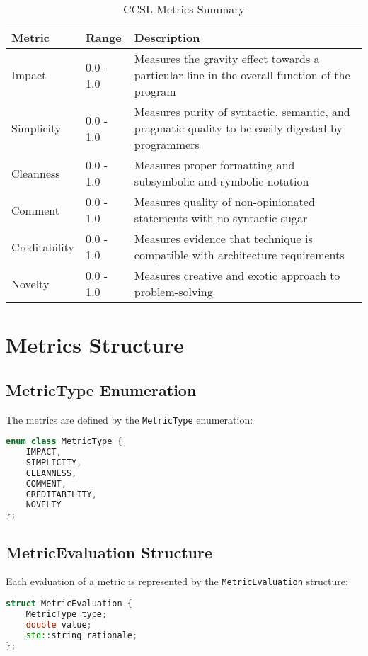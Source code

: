 \documentclass[11pt,a4paper]{report}
\begin{document}
\begin{table}[H]
\centering
\begin{tabular}{llp{8cm}}
\toprule
\textbf{Metric} & \textbf{Range} & \textbf{Description} \\
\midrule
Impact & 0.0 - 1.0 & Measures the gravity effect towards a particular line in the overall function of the program \\
Simplicity & 0.0 - 1.0 & Measures purity of syntactic, semantic, and pragmatic quality to be easily digested by programmers \\
Cleanness & 0.0 - 1.0 & Measures proper formatting and subsymbolic and symbolic notation \\
Comment & 0.0 - 1.0 & Measures quality of non-opinionated statements with no syntactic sugar \\
Creditability & 0.0 - 1.0 & Measures evidence that technique is compatible with architecture requirements \\
Novelty & 0.0 - 1.0 & Measures creative and exotic approach to problem-solving \\
\bottomrule
\end{tabular}
\caption{CCSL Metrics Summary}
\end{table}

\section{Metrics Structure}

\subsection{MetricType Enumeration}
The metrics are defined by the \texttt{MetricType} enumeration:

\begin{lstlisting}[language=C++]
enum class MetricType {
    IMPACT,
    SIMPLICITY,
    CLEANNESS,
    COMMENT,
    CREDITABILITY,
    NOVELTY
};
\end{lstlisting}

\subsection{MetricEvaluation Structure}
Each evaluation of a metric is represented by the \texttt{MetricEvaluation} structure:

\begin{lstlisting}[language=C++]
struct MetricEvaluation {
    MetricType type;
    double value;
    std::string rationale;
};
\end{lstlisting}
\end{document}

